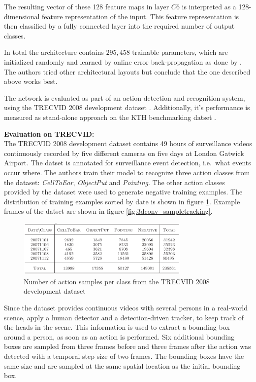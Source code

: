The resulting vector of these 128 feature maps in layer $C6$ is interpreted as a 128-dimensional feature representation of the input.
This feature representation is then classified by a fully connected layer into the required number of output classes.

In total the architecture contains $295,458$ trainable parameters, which are initialized randomly and learned by online error back-propagation as done by \textcite{lecun_gradient-based_1998-1}.
The authors tried other architectural layouts but conclude that the one described above works best.

The network is evaluated as part of an action detection and recognition system, using the TRECVID 2008 development dataset \cite{rose_trecvid_2009}.
Additionally, it's performance is measured as stand-alone approach on the KTH benchmarking datset \cite{schuldt_recognizing_2004}.

\textbf{Evaluation on TRECVID:} \\
The TRECVID 2008 development dataset \cite{rose_trecvid_2009} contains 49 hours of surveillance videos continuously recorded by five different cameras on five days at London Gatwick Airport.
The datset is annotated for surveillance event detection, i.e.\ what events occur where.
The authors train their model to recognize three action classes from the dataset: \textit{CellToEar}, \textit{ObjectPut} and \textit{Pointing}.
The other action classes provided by the dataset were used to generate negative training examples.
The distribution of training examples sorted by date is shown in figure \ref{fig:3dconv_dataset}.
Example frames of the datset are shown in figure \ref{fig:3dconv_sampletracking}.

\begin{figure}[H]
    \centering
    \includegraphics[width=0.75\textwidth]{img_deep/3dconv_dataset}
    \caption{Number of action samples per class from the TRECVID 2008 development dataset \cite{ji_3d_2013}}
    \label{fig:3dconv_dataset}
\end{figure}

Since the dataset provides continuous videos with several persons in a real-world scence, \textcite{ji_3d_2013} apply a human detector and a detection-driven tracker, to keep track of the heads in the scene.
This information is used to extract a bounding box around a person, as soon as an action is performed. 
Six additional bounding boxes are sampled from three frames before and three frames after the action was detected with a temporal step size of two frames.
The bounding boxes have the same size and are sampled at the same spatial location as the initial bounding box.

